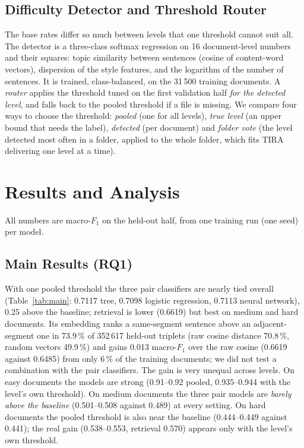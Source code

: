 \documentclass[runningheads]{llncs}
\begin{document}
\subsection{Difficulty Detector and Threshold Router}

The base rates differ so much between levels that one threshold cannot suit all. The detector is a three-class softmax regression on 16 document-level numbers and their squares: topic similarity between sentences (cosine of content-word vectors), dispersion of the style features, and the logarithm of the number of sentences. It is trained, class-balanced, on the 31\,500 training documents. A \emph{router} applies the threshold tuned on the first validation half \emph{for the detected level}, and falls back to the pooled threshold if a file is missing. We compare four ways to choose the threshold: \emph{pooled} (one for all levels), \emph{true level} (an upper bound that needs the label), \emph{detected} (per document) and \emph{folder vote} (the level detected most often in a folder, applied to the whole folder, which fits TIRA delivering one level at a time).

\section{Results and Analysis}
\label{sec:results}

All numbers are macro-$F_1$ on the held-out half, from one training run (one seed) per model.

\subsection{Main Results (RQ1)}

With one pooled threshold the three pair classifiers are nearly tied overall (Table~\ref{tab:main}: 0.7117 tree, 0.7098 logistic regression, 0.7113 neural network), 0.25 above the baseline; retrieval is lower (0.6619) but best on medium and hard documents. Its embedding ranks a same-segment sentence above an adjacent-segment one in 73.9\,\% of 352\,617 held-out triplets (raw cosine distance 70.8\,\%, random vectors 49.9\,\%) and gains 0.013 macro-$F_1$ over the raw cosine (0.6619 against 0.6485) from only 6\,\% of the training documents; we did not test a combination with the pair classifiers. The gain is very unequal across levels. On easy documents the models are strong (0.91--0.92 pooled, 0.935--0.944 with the level's own threshold). On medium documents the three pair models are \emph{barely above the baseline} (0.501--0.508 against 0.489) at every setting. On hard documents the pooled threshold is also near the baseline (0.444--0.449 against 0.441); the real gain (0.538--0.553, retrieval 0.570) appears only with the level's own threshold.
\end{document}
